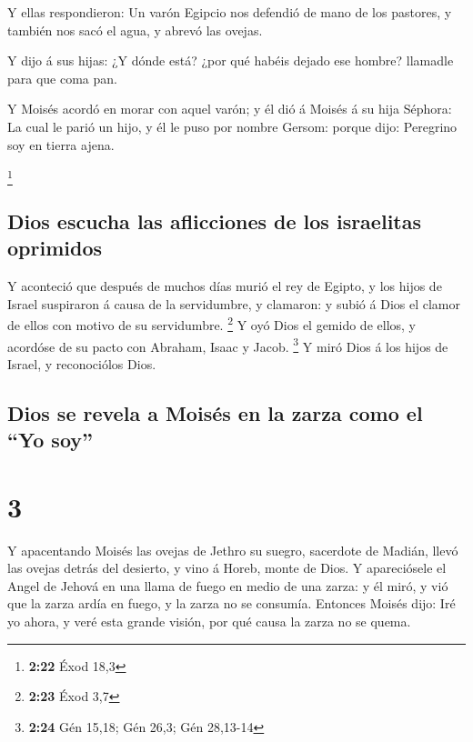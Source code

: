  Y ellas respondieron: Un varón Egipcio nos defendió de
mano de los pastores, y también nos sacó el agua, y abrevó las ovejas.

 Y dijo á sus hijas: ¿Y dónde está? ¿por qué habéis
dejado ese hombre? llamadle para que coma pan.

 Y Moisés acordó en morar con aquel varón; y él dió á
Moisés á su hija Séphora:  La cual le parió un hijo, y él
le puso por nombre Gersom: porque dijo: Peregrino soy en tierra ajena.

\footnote{\textbf{2:22} Éxod 18,3}

\hypertarget{dios-escucha-las-aflicciones-de-los-israelitas-oprimidos}{%
\subsection{Dios escucha las aflicciones de los israelitas
oprimidos}\label{dios-escucha-las-aflicciones-de-los-israelitas-oprimidos}}

 Y aconteció que después de muchos días murió el rey de
Egipto, y los hijos de Israel suspiraron á causa de la servidumbre, y
clamaron: y subió á Dios el clamor de ellos con motivo de su
servidumbre. \footnote{\textbf{2:23} Éxod 3,7}  Y oyó
Dios el gemido de ellos, y acordóse de su pacto con Abraham, Isaac y
Jacob. \footnote{\textbf{2:24} Gén 15,18; Gén 26,3; Gén 28,13-14}
 Y miró Dios á los hijos de Israel, y reconociólos Dios.

\hypertarget{dios-se-revela-a-moisuxe9s-en-la-zarza-como-el-yo-soy}{%
\subsection{Dios se revela a Moisés en la zarza como el ``Yo
soy''}\label{dios-se-revela-a-moisuxe9s-en-la-zarza-como-el-yo-soy}}

\hypertarget{section-2}{%
\section{3}\label{section-2}}

 Y apacentando Moisés las ovejas de Jethro su suegro,
sacerdote de Madián, llevó las ovejas detrás del desierto, y vino á
Horeb, monte de Dios.  Y apareciósele el Angel de Jehová
en una llama de fuego en medio de una zarza: y él miró, y vió que la
zarza ardía en fuego, y la zarza no se consumía.  Entonces
Moisés dijo: Iré yo ahora, y veré esta grande visión, por qué causa la
zarza no se quema.

